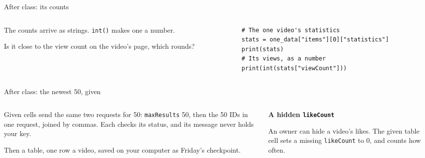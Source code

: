 \documentclass[9pt,aspectratio=169]{beamer}
\begin{document}
\begin{frame}[fragile]{After class: its counts}
    \begin{columns}[T]
        \begin{column}{0.37\textwidth}
            The counts arrive as strings. \texttt{int()} makes one a number.

            \medskip
            Is it close to the view count on the video's page, which rounds?
        \end{column}
        \begin{column}{0.6\textwidth}
\begin{lstlisting}
# The one video's statistics
stats = one_data["items"][0]["statistics"]
print(stats)
# Its views, as a number
print(int(stats["viewCount"]))
\end{lstlisting}
        \end{column}
    \end{columns}
\end{frame}

\begin{frame}{After class: the newest 50, given}
    \begin{columns}[T]
        \begin{column}{0.6\textwidth}
            Given cells send the same two requests for 50: \texttt{maxResults} 50, then the 50 IDs in one request, joined by commas. Each checks its status, and its message never holds your key.

            \medskip
            Then a table, one row a video, saved on your computer as Friday's checkpoint.
        \end{column}
        \begin{column}{0.35\textwidth}
            \textbf{A hidden \texttt{likeCount}}\\[2pt]
            {\footnotesize An owner can hide a video's likes. The given table cell sets a missing \texttt{likeCount} to 0, and counts how often.\par}
        \end{column}
    \end{columns}
\end{frame}
\end{document}
